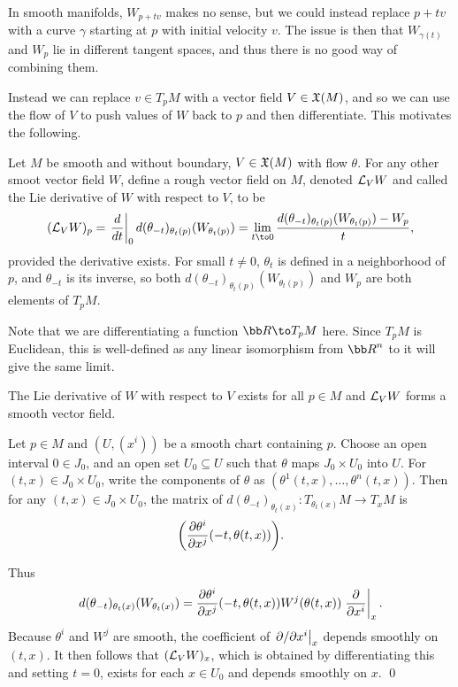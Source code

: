 In smooth manifolds, $W_{p+tv}$ makes no sense, but we could instead replace $p+tv$ with a curve $\gamma$ starting at $p$ with initial velocity $v$.
The issue is then that $W_{\gamma(t)}$ and $W_p$ lie in different tangent spaces, and thus there is no good way of combining them.

Instead we can replace $v\in T_pM$ with a vector field $V\in{\frak X}(M)$, and so we can use the flow of $V$ to push values of $W$ back to $p$ and then differentiate.
This motivates the following.

\bdefn

    Let $M$ be smooth and without boundary, $V\in{\frak X}(M)$ with flow $\theta$.
    For any other smoot vector field $W$, define a rough vector field on $M$, denoted ${{\cal L}}_VW$ and called the {\emphcolor Lie derivative} of $W$ with respect to
    $V$, to be
    $$ (\L_VW)_p = \evdrv t_0 d(\theta_{-t})_{\theta_t(p)}(W_{\theta_t(p)}) = \lim_{t\to0}\frac{d(\theta_{-t})_{\theta_t(p)}(W_{\theta_t(p)})-W_p}t , $$
    provided the derivative exists.
    For small $t\neq0$, $\theta_t$ is defined in a neighborhood of $p$, and $\theta_{-t}$ is its inverse, so both $d(\theta_{-t})_{\theta_t(p)}(W_{\theta_t(p)})$
    and $W_p$ are both elements of $T_pM$.

\edefn

Note that we are differentiating a function $\bR\to T_pM$ here.
Since $T_pM$ is Euclidean, this is well-defined as any linear isomorphism from $\bR^n$ to it will give the same limit.

\blemm

    The Lie derivative of $W$ with respect to $V$ exists for all $p\in M$ and ${{\cal L}}_VW$ forms a smooth vector field.

\elemm

\bproof

    Let $p\in M$ and $(U,(x^i))$ be a smooth chart containing $p$.
    Choose an open interval $0\in J_0$, and an open set $U_0\subseteq U$ such that $\theta$ maps $J_0\times U_0$ into $U$.
    For $(t,x)\in J_0\times U_0$, write the components of $\theta$ as $(\theta^1(t,x),\dots,\theta^n(t,x))$.
    Then for any $(t,x)\in J_0\times U_0$, the matrix of $d(\theta_{-t})_{\theta_t(x)}\colon T_{\theta_t(x)}M\to T_xM$ is
    $$ \mathopen{}\mathclose{\left({{\partial \theta^i}\over{\partial x^j}}(-t,\theta(t,x))\right)} . $$

    Thus
    $$ d(\theta_{-t})_{\theta_t(x)}(W_{\theta_t(x)}) = {{\partial \theta^i}\over{\partial x^j}}(-t,\theta(t,x))W^j(\theta(t,x))\left.{{\partial }\over{\partial x^i}}\right|_x . $$
    Because $\theta^i$ and $W^j$ are smooth, the coefficient of $\left.\partial /\partial x^i\right|_x$ depends smoothly on $(t,x)$.
    It then follows that $({{\cal L}}_VW)_x$, which is obtained by differentiating this and setting $t=0$, exists for each $x\in U_0$ and depends smoothly
    on $x$.
    \qed

